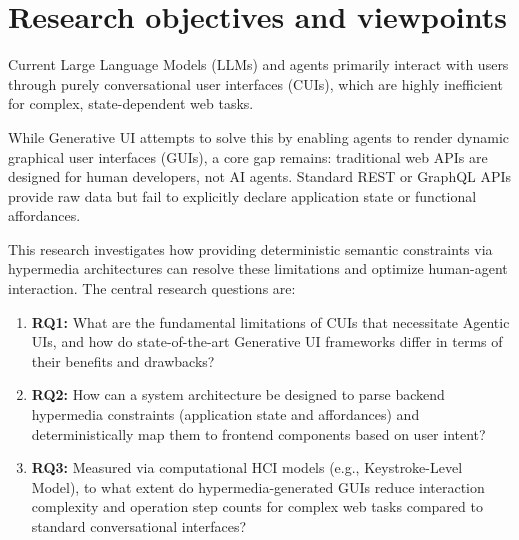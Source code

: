 \documentclass[12pt,a4paper,english,oneside]{article}
\begin{document}
\section{Research objectives and viewpoints}


Current Large Language Models (LLMs) and agents primarily interact with users through purely conversational user interfaces (CUIs), which are highly inefficient for complex, state-dependent web tasks. 

While Generative UI attempts to solve this by enabling agents to render dynamic graphical user interfaces (GUIs), a core gap remains: traditional web APIs are designed for human developers, not AI agents. Standard REST or GraphQL APIs provide raw data but fail to explicitly declare application state or functional affordances. 

This research investigates how providing deterministic semantic constraints via hypermedia architectures can resolve these limitations and optimize human-agent interaction. The central research questions are:

\begin{enumerate}
    \item[] \textbf{RQ1:} What are the fundamental limitations of CUIs that necessitate Agentic UIs, and how do state-of-the-art Generative UI frameworks differ in terms of their benefits and drawbacks?
    \item[] \textbf{RQ2:} How can a system architecture be designed to parse backend hypermedia constraints (application state and affordances) and deterministically map them to frontend components based on user intent?
    \item[] \textbf{RQ3:} Measured via computational HCI models (e.g., Keystroke-Level Model), to what extent do hypermedia-generated GUIs reduce interaction complexity and operation step counts for complex web tasks compared to standard conversational interfaces?
\end{enumerate}

\end{document}
